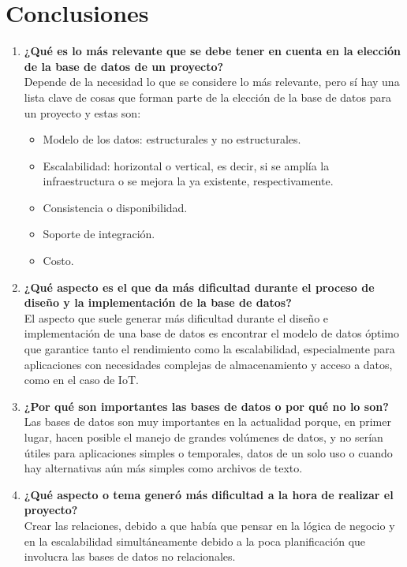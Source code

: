 \section{Conclusiones}

\begin{enumerate}
    \item \textbf{¿Qué es lo más relevante que se debe tener en cuenta en la elección de la base de datos de un proyecto?} \\
    Depende de la necesidad lo que se considere lo más relevante, pero sí hay una lista clave de cosas que forman parte de la elección de la base de datos para un proyecto y estas son:
    \begin{itemize}
        \item Modelo de los datos: estructurales y no estructurales.
        \item Escalabilidad: horizontal o vertical, es decir, si se amplía la infraestructura o se mejora la ya existente, respectivamente.
        \item Consistencia o disponibilidad.
        \item Soporte de integración.
        \item Costo.
    \end{itemize}
    
    \item \textbf{¿Qué aspecto es el que da más dificultad durante el proceso de diseño y la implementación de la base de datos?} \\
    El aspecto que suele generar más dificultad durante el diseño e implementación de una base de datos es encontrar el modelo de datos óptimo que garantice tanto el rendimiento como la escalabilidad, especialmente para aplicaciones con necesidades complejas de almacenamiento y acceso a datos, como en el caso de IoT.
    
    \item \textbf{¿Por qué son importantes las bases de datos o por qué no lo son?} \\
    Las bases de datos son muy importantes en la actualidad porque, en primer lugar, hacen posible el manejo de grandes volúmenes de datos, y no serían útiles para aplicaciones simples o temporales, datos de un solo uso o cuando hay alternativas aún más simples como archivos de texto.
    
    \item \textbf{¿Qué aspecto o tema generó más dificultad a la hora de realizar el proyecto?} \\
    Crear las relaciones, debido a que había que pensar en la lógica de negocio y en la escalabilidad simultáneamente debido a la poca planificación que involucra las bases de datos no relacionales.
    

\end{enumerate}
